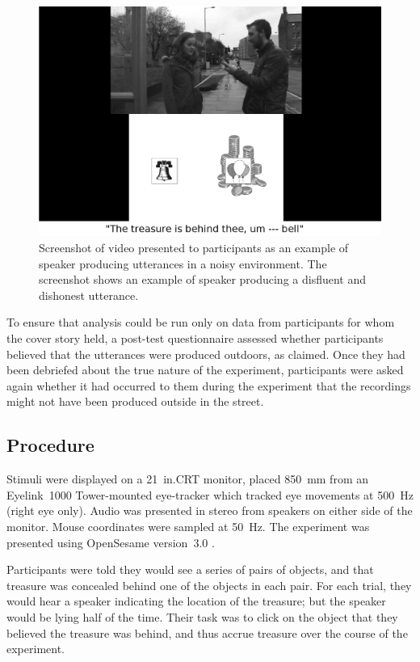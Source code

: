\documentclass[a4paper,man,natbib]{apa6}
\begin{document}
\begin{figure}[Ht]
  \centering
	\includegraphics[scale=.2]{convincer.png}
  \caption{Screenshot of video presented to participants as an example of speaker producing utterances in a noisy environment. The screenshot shows an example of speaker producing a disfluent and dishonest utterance.}
  \label{fig:vid}
\end{figure}


To ensure that analysis could be run only on data from participants for whom the cover story held, a post-test questionnaire assessed whether participants believed that the utterances were produced outdoors, as claimed.
Once they had been debriefed about the true nature of the experiment, participants were asked again whether it had occurred to them during the experiment that the recordings might not have been produced outside in the street.

\subsection{Procedure}
Stimuli were displayed on a 21~in.\@ CRT monitor, placed 850~mm from an Eyelink~1000 Tower-mounted eye-tracker which tracked eye movements at 500~Hz (right eye only). 
Audio was presented in stereo from speakers on either side of the monitor. 
Mouse coordinates were sampled at 50~Hz. 
The experiment was presented using OpenSesame version~3.0 \citep{Mathot2012}.


Participants were told they would see a series of pairs of objects, and that treasure was concealed behind one of the objects in each pair.
For each trial, they would hear a speaker indicating the location of the treasure; but the speaker would be lying half of the time.
Their task was to click on the object that they believed the treasure was behind, and thus accrue treasure over the course of the experiment.
\end{document}
